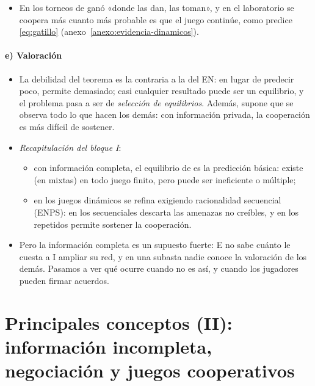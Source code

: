 \documentclass[11pt]{article}
\begin{document}
\begin{itemize}
\item En los torneos de \textcite{Axelrod1984Evolution} ganó «donde las dan, las toman», y en el laboratorio se coopera más cuanto más probable es que el juego continúe, como predice \eqref{eq:gatillo} (anexo~\ref{anexo:evidencia-dinamicos}).
\end{itemize}

\paragraph{e) Valoración}

\begin{itemize}
\item La debilidad del teorema es la contraria a la del EN: en lugar de predecir poco, permite demasiado; casi cualquier resultado puede ser un equilibrio, y el problema pasa a ser de \emph{selección de equilibrios}. Además, supone que se observa todo lo que hacen los demás: con información privada, la cooperación es más difícil de sostener.
\end{itemize}

\begin{itemize}
\item \emph{Recapitulación del bloque I}:
  \begin{itemize}
  \item con información completa, el equilibrio de  es la predicción básica: existe (en mixtas) en todo juego finito, pero puede ser ineficiente o múltiple;
  \item en los juegos dinámicos se refina exigiendo racionalidad secuencial (ENPS): en los secuenciales descarta las amenazas no creíbles, y en los repetidos permite sostener la cooperación.
  \end{itemize}
\item Pero la información completa es un supuesto fuerte: E no sabe cuánto le cuesta a I ampliar su red, y en una subasta nadie conoce la valoración de los demás. Pasamos a ver qué ocurre cuando no es así, y cuando los jugadores pueden firmar acuerdos.
\end{itemize}




\section{Principales conceptos (II): información incompleta,\cortetitulo{} negociación y juegos cooperativos}\label{sec:conceptos-informacion-incompleta}
\end{document}
